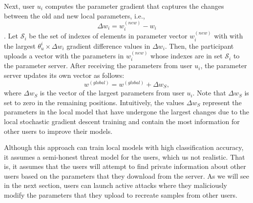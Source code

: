 \documentclass[conference]{IEEEtran}
\begin{document}
Next, user $u_i$ computes the parameter gradient that captures the changes between the old and new local parameters, i.e., 
$$\Delta w_i =  w_i^{(new)} -  w_i$$. 
Let $\mathcal{S}_i$ be the set of indexes of elements in parameter vector $w_i^{(new)}$ with 
with the largest  $\theta_u^{i} \times \Delta w_i$ gradient difference values in $\Delta w_i$. 
Then, the participant uploads a vector with the parameters in $w_i^{(new)}$ whose indexes are in set $\mathcal{S}_i$ to the parameter
server.  After receiving the parameters from user $u_i$, the parameter server updates its own vector as follows:
$$w^{(global)} =  w^{(global)} +  \Delta w_S,$$
where $\Delta w_S$ is the vector of the largest parameters from user $u_i$. Note that $\Delta w_S$  is set to zero in the remaining
positions. Intuitively, the  values $\Delta w_S$ represent the parameters in the local model that have undergone the largest
changes due to the local stochastic gradient descent training and contain the most information for other users to improve their models.


Although this approach can train local models with high classification accuracy,  it assumes a semi-honest threat model for the users,
which us not realistic. That is, it assumes that the users will attempt to find private information about other users based on the parameters that they
download from the server. As we will see in the next section, users can launch active attacks where they maliciously modify the
parameters that they upload to recreate samples from other users. 







\end{document}
